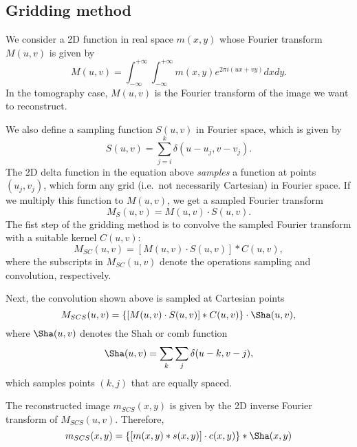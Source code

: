 \subsection{Gridding method}
We consider a 2D function in real space $m(x,y)$ whose Fourier transform $M(u,v)$ is given by
\begin{equation}
M(u,v) = \int_{-\infty}^{+\infty} \int_{-\infty}^{+\infty} m(x,y) e^{2\pi i (ux+vy)} dx dy.
\end{equation}
In the tomography case, $M(u,v)$ is the Fourier transform of the image we want to reconstruct.

We also define a sampling function $S(u,v)$ in Fourier space, which is given by
\begin{equation}
S(u,v) = \sum_{j=i}^{k} \delta(u-u_j, v-v_j).
\end{equation}
The 2D delta function in the equation above \emph{samples} a function at points $(u_j, v_j)$, which form any grid (i.e.~not necessarily Cartesian) in Fourier space. If we multiply this function to $M(u,v)$, we get a sampled Fourier transform
\begin{equation}
M_S(u,v) = M(u,v) \cdot S(u,v).
\end{equation}
The fist step of the gridding method is to convolve the sampled Fourier transform with a suitable kernel $C(u,v)$:
\begin{equation}
M_{SC}(u,v) = [M(u,v) \cdot S(u,v)] \ast C(u,v),
\end{equation}
where the subscripts in $M_{SC}(u,v)$ denote the operations sampling and convolution, respectively. 

Next, the convolution shown above is sampled at Cartesian points
\begin{equation}
M_{SCS}(u,v) = \{[M(u,v) \cdot S(u,v)] \ast C(u,v)\} \cdot \Sha(u,v),
\end{equation}
where $\Sha(u,v)$ denotes the Shah or comb function
\begin{equation}
\Sha(u,v) = \sum_{k} \sum_{j} \delta(u-k,v-j),
\end{equation}
which samples points $(k,j)$ that are equally spaced.

The reconstructed image $m_{SCS}(x,y)$ is given by the 2D inverse Fourier transform of $M_{SCS}(u,v)$. Therefore,
\begin{equation}
m_{SCS}(x,y) = \{[m(x,y) \ast s(x,y)] \cdot c(x,y)\} \ast \Sha(x,y)
\end{equation}

